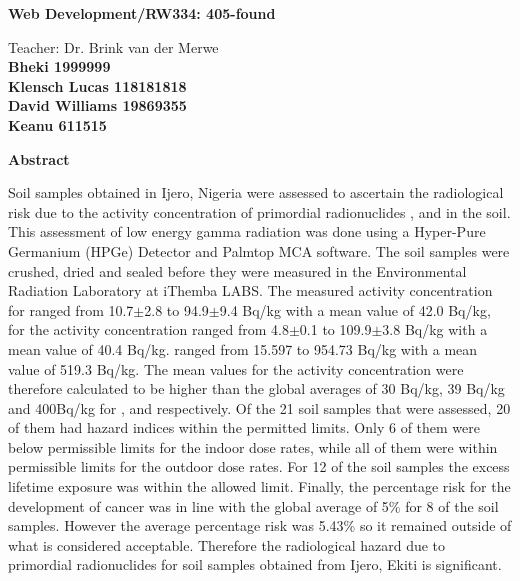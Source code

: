 \thispagestyle{plain}
\begin{center}
    \Large
    \textbf{Web Development/RW334: 405-found}
    
    \vspace{0.4cm}
    \large
    Teacher: Dr. Brink van der Merwe\\
    
    \vspace{0.4cm}
    \textbf{Bheki 1999999 \\ Klensch Lucas 118181818 \\ David Williams 19869355 \\ Keanu 611515\\ }
    
    \vspace{0.9cm}
    \textbf{Abstract}
    
\end{center}
Soil samples obtained in Ijero, Nigeria were assessed to ascertain the radiological risk due to the activity concentration of primordial radionuclides ,  and  in the soil. This assessment of low energy gamma radiation was done using a Hyper-Pure Germanium (HPGe) Detector and Palmtop MCA software. The soil samples were crushed, dried and sealed before they were measured in the Environmental Radiation Laboratory at iThemba LABS. The measured activity concentration for   ranged from 10.7$\pm$2.8 to 94.9$\pm$9.4 Bq/kg with a mean value of 42.0 Bq/kg, for  the activity concentration ranged from 4.8$\pm$0.1 to 109.9$\pm$3.8 Bq/kg with a mean value of 40.4 Bq/kg.  ranged from 15.597 to 954.73 Bq/kg with a mean value of 519.3 Bq/kg. The mean values for the activity concentration were therefore calculated to be higher than the global averages of 30 Bq/kg, 39 Bq/kg and 400Bq/kg for ,  and  respectively. Of the 21 soil samples that were assessed, 20 of them had hazard indices within the permitted limits. Only 6 of them were below permissible limits for the indoor dose rates, while all of them were within permissible limits for the outdoor dose rates. For 12 of the soil samples the excess lifetime exposure was within the allowed limit. Finally, the percentage risk for the development of cancer was in line with the global average of 5\% for 8 of the soil samples. However the average percentage risk was 5.43\% so it remained outside of what is considered acceptable. Therefore the radiological hazard due to primordial radionuclides for soil samples obtained from Ijero, Ekiti is significant.

